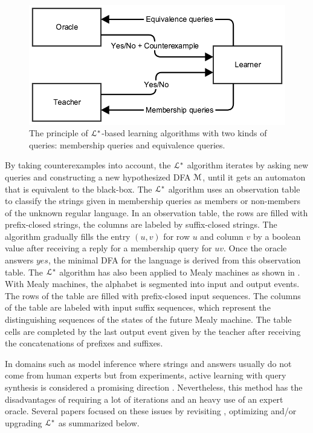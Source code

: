 \begin{figure}[h]
    \begin{center}
        \includegraphics[width=1.0\linewidth]{figures/angluin.png}
    \end{center}

    \caption{The principle of $\EuScript{L}^*$-based learning
    algorithms with two kinds of queries: membership queries and
    equivalence queries.}
    \label{fig:angluin}
\end{figure}

By taking counterexamples into account, the $\EuScript{L}^*$
algorithm iterates by asking new queries and constructing a new
hypothesized DFA $\EuScript{M}$, until it gets an automaton that
is equivalent to the black-box. The $\EuScript{L}^*$ algorithm
uses an observation table to classify the strings given in
membership queries as members or non-members of the unknown
regular language. In an observation table, the rows are filled
with prefix-closed strings, the columns are labeled by
suffix-closed strings. The algorithm gradually fills the entry
$(u,v)$ for row $u$ and column $v$ by a boolean value after
receiving a reply for a membership query for $uv$. Once the
oracle answers $yes$, the minimal DFA for the language is derived
from this observation table. The $\EuScript{L}^*$ algorithm has
also been applied to Mealy machines \cite{6771467} as shown in
\cite{DBLP:phd/de/Niese2003,steffen11}.  With Mealy machines, the
alphabet is segmented into input and output events. The rows of
the table are filled with prefix-closed input sequences. The
columns of the table are labeled with input suffix sequences,
which represent the distinguishing sequences of the states of the
future Mealy machine. The table cells are completed by the last
output event given by the teacher after receiving the
concatenations of prefixes and suffixes.

In domains such as model inference where strings and answers
usually do not come from human experts but from experiments,
active learning with query synthesis is considered a promising
direction \cite{settles.tr09}. Nevertheless, this method has the
disadvantages of requiring a lot of iterations and an heavy use
of an expert oracle. Several papers focused on these issues by
revisiting \cite{regularinfBerg06,regularinfBerg08}, optimizing
and/or upgrading $\EuScript{L}^*$
\cite{Raffelt:2005:LLA:1081180.1081189,irfan12} as summarized
below.

